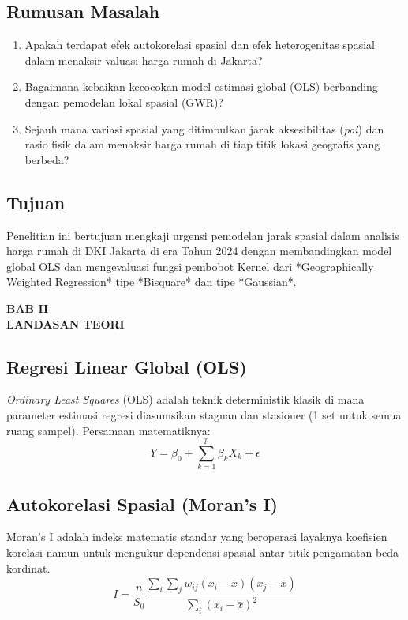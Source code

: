 \documentclass[12pt,a4paper]{article}
\begin{document}
\subsection{Rumusan Masalah}
\begin{enumerate}
    \item Apakah terdapat efek autokorelasi spasial dan efek heterogenitas spasial dalam menaksir valuasi harga rumah di Jakarta?
    \item Bagaimana kebaikan kecocokan model estimasi global (OLS) berbanding dengan pemodelan lokal spasial (GWR)?
    \item Sejauh mana variasi spasial yang ditimbulkan jarak aksesibilitas (\textit{poi}) dan rasio fisik dalam menaksir harga rumah di tiap titik lokasi geografis yang berbeda?
\end{enumerate}

\subsection{Tujuan}
Penelitian ini bertujuan mengkaji urgensi pemodelan jarak spasial dalam analisis harga rumah di DKI Jakarta di era Tahun 2024 dengan membandingkan model global OLS dan mengevaluasi fungsi pembobot Kernel dari *Geographically Weighted Regression* tipe *Bisquare* dan tipe *Gaussian*.

\newpage
\begin{center}
    \bfseries\large
    BAB II \\
    LANDASAN TEORI
\end{center}
\setcounter{section}{2}
\setcounter{subsection}{0}

\subsection{Regresi Linear Global (OLS)}
\textit{Ordinary Least Squares} (OLS) adalah teknik deterministik klasik di mana parameter estimasi regresi diasumsikan stagnan dan stasioner (1 set untuk semua ruang sampel). Persamaan matematiknya:
\[ Y = \beta_0 + \sum_{k=1}^{p} \beta_k X_k + \epsilon \]

\subsection{Autokorelasi Spasial (Moran's I)}
Moran's I adalah indeks matematis standar yang beroperasi layaknya koefisien korelasi namun untuk mengukur dependensi spasial antar titik pengamatan beda kordinat.
\[ I = \frac{n}{S_0} \frac{\sum_i \sum_j w_{ij} (x_i - \bar{x})(x_j - \bar{x})}{\sum_i (x_i - \bar{x})^2} \]
\end{document}
